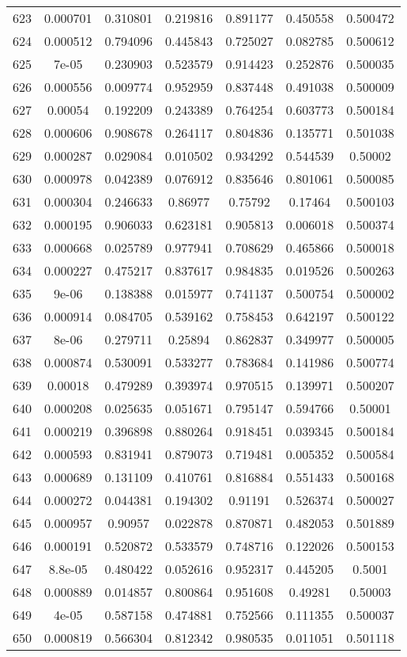 \begin{table}
\begin{tabular}{c|c|c|c|c|c|c}
623 & 0.000701 & 0.310801 & 0.219816 & 0.891177 & 0.450558 & 0.500472\\
624 & 0.000512 & 0.794096 & 0.445843 & 0.725027 & 0.082785 & 0.500612\\
625 & 7e-05 & 0.230903 & 0.523579 & 0.914423 & 0.252876 & 0.500035\\
626 & 0.000556 & 0.009774 & 0.952959 & 0.837448 & 0.491038 & 0.500009\\
627 & 0.00054 & 0.192209 & 0.243389 & 0.764254 & 0.603773 & 0.500184\\
628 & 0.000606 & 0.908678 & 0.264117 & 0.804836 & 0.135771 & 0.501038\\
629 & 0.000287 & 0.029084 & 0.010502 & 0.934292 & 0.544539 & 0.50002\\
630 & 0.000978 & 0.042389 & 0.076912 & 0.835646 & 0.801061 & 0.500085\\
631 & 0.000304 & 0.246633 & 0.86977 & 0.75792 & 0.17464 & 0.500103\\
632 & 0.000195 & 0.906033 & 0.623181 & 0.905813 & 0.006018 & 0.500374\\
633 & 0.000668 & 0.025789 & 0.977941 & 0.708629 & 0.465866 & 0.500018\\
634 & 0.000227 & 0.475217 & 0.837617 & 0.984835 & 0.019526 & 0.500263\\
635 & 9e-06 & 0.138388 & 0.015977 & 0.741137 & 0.500754 & 0.500002\\
636 & 0.000914 & 0.084705 & 0.539162 & 0.758453 & 0.642197 & 0.500122\\
637 & 8e-06 & 0.279711 & 0.25894 & 0.862837 & 0.349977 & 0.500005\\
638 & 0.000874 & 0.530091 & 0.533277 & 0.783684 & 0.141986 & 0.500774\\
639 & 0.00018 & 0.479289 & 0.393974 & 0.970515 & 0.139971 & 0.500207\\
640 & 0.000208 & 0.025635 & 0.051671 & 0.795147 & 0.594766 & 0.50001\\
641 & 0.000219 & 0.396898 & 0.880264 & 0.918451 & 0.039345 & 0.500184\\
642 & 0.000593 & 0.831941 & 0.879073 & 0.719481 & 0.005352 & 0.500584\\
643 & 0.000689 & 0.131109 & 0.410761 & 0.816884 & 0.551433 & 0.500168\\
644 & 0.000272 & 0.044381 & 0.194302 & 0.91191 & 0.526374 & 0.500027\\
645 & 0.000957 & 0.90957 & 0.022878 & 0.870871 & 0.482053 & 0.501889\\
646 & 0.000191 & 0.520872 & 0.533579 & 0.748716 & 0.122026 & 0.500153\\
647 & 8.8e-05 & 0.480422 & 0.052616 & 0.952317 & 0.445205 & 0.5001\\
648 & 0.000889 & 0.014857 & 0.800864 & 0.951608 & 0.49281 & 0.50003\\
649 & 4e-05 & 0.587158 & 0.474881 & 0.752566 & 0.111355 & 0.500037\\
650 & 0.000819 & 0.566304 & 0.812342 & 0.980535 & 0.011051 & 0.501118\\
\end{tabular}
\end{table}
